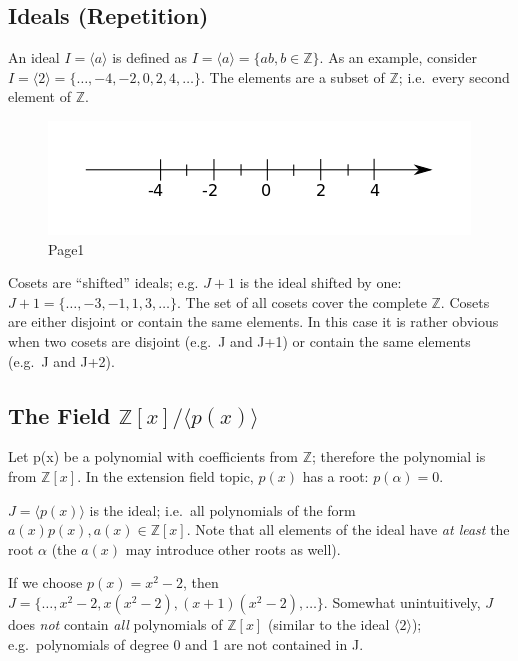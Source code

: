
\subsection{Ideals (Repetition)}\label{ideals-repetition}

An ideal \(I = \langle a \rangle\) is defined as
\(I = \langle a \rangle = \{a b, b\in \mathbb{Z} \}\). As an example,
consider \(I = \langle 2 \rangle = \{\ldots, -4,-2,0,2,4,\ldots\}\). The
elements are a subset of \(\mathbb{Z}\); i.e.~every second element of
\(\mathbb{Z}\).

\begin{figure}[H]
\centering
\includegraphics{images/polynomials_03.png}
\caption{Page1}
\end{figure}

Cosets are ``shifted'' ideals; e.g. \(J+1\) is the ideal shifted by one:
\(J+1 = \{\ldots,-3,-1,1,3,\ldots\}\). The set of all cosets cover the
complete \(\mathbb{Z}\). Cosets are either disjoint or contain the same
elements. In this case it is rather obvious when two cosets are disjoint
(e.g.~J and J+1) or contain the same elements (e.g.~J and J+2).

\subsection{\texorpdfstring{The Field
\(\mathbb{Z}[x] / \langle p(x) \rangle\)}{The Field \textbackslash{}mathbb\{Z\}{[}x{]} / \textbackslash{}langle p(x) \textbackslash{}rangle}}\label{the-field-mathbbzx-langle-px-rangle}

Let p(x) be a polynomial with coefficients from \(\mathbb{Z}\);
therefore the polynomial is from \(\mathbb{Z}[x]\). In the extension
field topic, \(p(x)\) has a root: \(p(\alpha) = 0\).

\(J = \langle p(x) \rangle\) is the ideal; i.e.~all polynomials of the
form \(a(x)p(x), a(x) \in \mathbb{Z}[x]\). Note that all elements of the
ideal have \emph{at least} the root \(\alpha\) (the \(a(x)\) may
introduce other roots as well).

If we choose \(p(x) = x^2-2\), then
\(J = \{ \ldots, x^2-2, x(x^2-2), (x+1)(x^2-2), \ldots \}\). Somewhat
unintuitively, \(J\) does \emph{not} contain \emph{all} polynomials of
\(\mathbb{Z}[x]\) (similar to the ideal \(\langle 2 \rangle\));
e.g.~polynomials of degree 0 and 1 are not contained in J.

